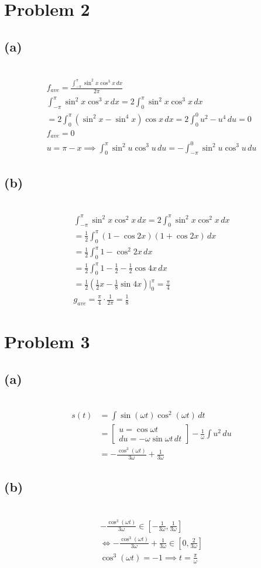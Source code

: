 \documentclass[12pt]{article}
\newcommand{\problem}[1]{\section{Problem #1}}
\newcommand{\subproblem}[1]{\subsection{(#1)} \,}
\begin{document}
\problem{2}

\subproblem{a}
\begin{gather*}
    f_{ave} = \frac{\int_{-\pi}^\pi \sin^2 x \cos^3 x\, dx}{2\pi }\\
    \int_{-\pi}^\pi \sin^2 x \cos^3 x\, dx =  2 \int_{0}^\pi \sin^2 x \cos^3 x\, dx\\
    = 2 \int_{0}^\pi (\sin^2 x - \sin^4 x) \cos x\, dx = 2 \int_{0}^{0} u^2 - u^4  \, du = 0\\
    f_{ave} = \boxed{0}\\
    u =  \pi -x \implies \int_0^{\pi} \sin^2 u \cos^3 u\, du =  -\int_{-\pi}^0 \sin^2 u \cos^3 u\, du
\end{gather*}

\subproblem{b}
\begin{gather*}
    \int_{-\pi}^\pi \sin^2 x \cos^2  x \, dx = 2 \int_0^\pi \sin^2x\cos^2x\,dx\\
    = \frac{1}{2} \int_0^\pi (1-\cos 2x)(1+\cos 2x)\,dx\\
    = \frac{1}{2} \int_0^\pi 1-\cos^2 2x\,dx\\
    = \frac{1}{2} \int_0^\pi 1-\frac{1}{2}-\frac{1}{2} \cos 4x\,dx\\
    = \frac{1}{2}(\frac{1}{2}x - \frac{1}{8}\sin 4x) \Big|^\pi_0 = \frac{\pi}{4}\\
    g_{ave} = \frac{\pi}{4}\cdot \frac{1}{2\pi} = \boxed{\frac{1}{8}}
\end{gather*}

\problem{3}

\subproblem{a}
\begin{align*}
    s(t) &= \int \sin (\omega t)\cos^2(\omega t)\, dt\\
    &= \begin{bmatrix}
        u =\cos \omega t\\
        du= -\omega \sin \omega t\, dt
    \end{bmatrix} 
    -\frac{1}{\omega} \int u^2\, du\\
    &= \boxed{- \frac{\cos^3(\omega t)}{3\omega } + \frac{1}{3\omega}}
\end{align*}

\subproblem{b}
\begin{gather*}
    - \frac{\cos^3(\omega t)}{3\omega } \in [-\frac{1}{3\omega},\frac{1}{3\omega}]\\
    \iff - \frac{\cos^3(\omega t)}{3\omega } + \frac{1}{3\omega} \in [0,\frac{2}{3\omega}]\\
    \cos^3(\omega t)= -1 \implies \boxed{t=\frac{\pi}{\omega}}
\end{gather*}
\end{document}
